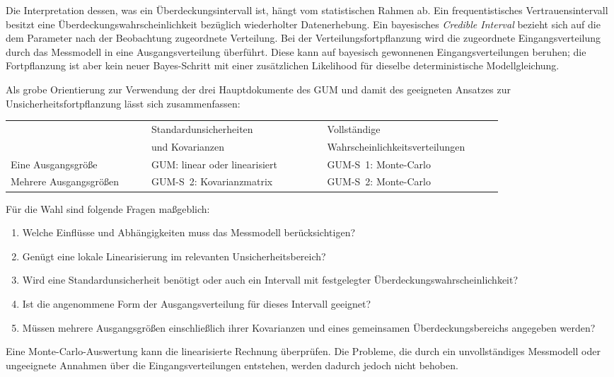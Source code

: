 Die Interpretation dessen, was ein Überdeckungsintervall ist, hängt vom statistischen Rahmen ab. Ein frequentistisches
Vertrauensintervall besitzt eine Überdeckungswahrscheinlichkeit bezüglich
wiederholter Datenerhebung. Ein bayesisches \textsl{Credible Interval}
bezieht sich auf die dem Parameter nach der Beobachtung zugeordnete
Verteilung. Bei der Verteilungsfortpflanzung wird die zugeordnete
Eingangsverteilung durch das Messmodell in eine Ausgangsverteilung überführt.
Diese kann auf bayesisch gewonnenen Eingangsverteilungen beruhen; die
Fortpflanzung ist aber kein neuer Bayes-Schritt mit einer zusätzlichen
Likelihood für dieselbe deterministische Modellgleichung.

Als grobe Orientierung zur Verwendung der drei Hauptdokumente des GUM und damit des geeigneten Ansatzes zur Unsicherheitsfortpflanzung lässt sich zusammenfassen:

\begin{center}
\small
\renewcommand{\arraystretch}{1.25}
\begin{tabular}{p{0.24\linewidth}|p{0.30\linewidth}|p{0.30\linewidth}}
 & Standardunsicherheiten & Vollständige \\
 & und Kovarianzen & Wahrscheinlichkeitsverteilungen\\
\hline
Eine Ausgangsgröße &
GUM: linear oder linearisiert &
GUM-S~1: Monte-Carlo\\
\hline
Mehrere Ausgangsgrößen &
GUM-S~2: Kovarianzmatrix &
GUM-S~2: Monte-Carlo
\end{tabular}
\end{center}

Für die Wahl sind folgende Fragen maßgeblich:
\begin{enumerate}
\item Welche Einflüsse und Abhängigkeiten muss das Messmodell berücksichtigen?
\item Genügt eine lokale Linearisierung im relevanten Unsicherheitsbereich?
\item Wird eine Standardunsicherheit benötigt oder auch ein Intervall mit
festgelegter Überdeckungswahrscheinlichkeit?
\item Ist die angenommene Form der Ausgangsverteilung für dieses Intervall
geeignet?
\item Müssen mehrere Ausgangsgrößen einschließlich ihrer Kovarianzen und
eines gemeinsamen Überdeckungsbereichs angegeben werden?
\end{enumerate}
Eine Monte-Carlo-Auswertung kann die linearisierte Rechnung überprüfen.
Die Probleme, die durch ein unvollständiges Messmodell oder ungeeignete
Annahmen über die Eingangsverteilungen entstehen, werden dadurch
jedoch nicht behoben.

